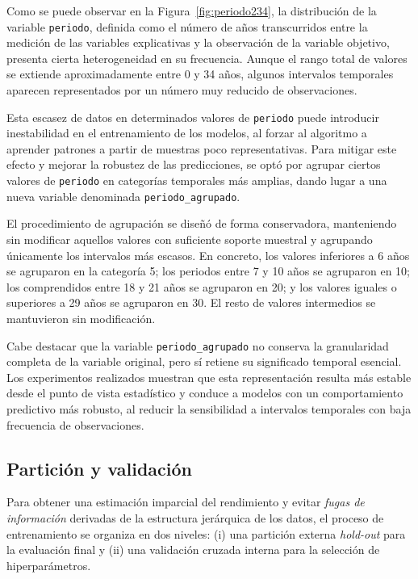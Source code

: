 Como se puede observar en la Figura~\ref{fig:periodo234}, la distribución de la variable \texttt{periodo}, definida como el número de años transcurridos entre la medición de las variables explicativas y la observación de la variable objetivo, presenta cierta heterogeneidad en su frecuencia. Aunque el rango total de valores se extiende aproximadamente entre 0 y 34 años, algunos intervalos temporales aparecen representados por un número muy reducido de observaciones.

Esta escasez de datos en determinados valores de \texttt{periodo} puede introducir inestabilidad en el entrenamiento de los modelos, al forzar al algoritmo a aprender patrones a partir de muestras poco representativas. Para mitigar este efecto y mejorar la robustez de las predicciones, se optó por agrupar ciertos valores de \texttt{periodo} en categorías temporales más amplias, dando lugar a una nueva variable denominada \texttt{periodo\_agrupado}.

El procedimiento de agrupación se diseñó de forma conservadora, manteniendo sin modificar aquellos valores con suficiente soporte muestral y agrupando únicamente los intervalos más escasos. En concreto, los valores inferiores a 6 años se agruparon en la categoría 5; los periodos entre 7 y 10 años se agruparon en 10; los comprendidos entre 18 y 21 años se agruparon en 20; y los valores iguales o superiores a 29 años se agruparon en 30. El resto de valores intermedios se mantuvieron sin modificación.

Cabe destacar que la variable \texttt{periodo\_agrupado} no conserva la granularidad completa de la variable original, pero sí retiene su significado temporal esencial. Los experimentos realizados muestran que esta representación resulta más estable desde el punto de vista estadístico y conduce a modelos con un comportamiento predictivo más robusto, al reducir la sensibilidad a intervalos temporales con baja frecuencia de observaciones.

\subsection{Partición y validación}

Para obtener una estimación imparcial del rendimiento y evitar \emph{fugas de información} derivadas de la estructura jerárquica de los datos, el proceso de entrenamiento se organiza en dos niveles: (i) una partición externa \emph{hold-out} para la evaluación final y (ii) una validación cruzada interna para la selección de hiperparámetros.

